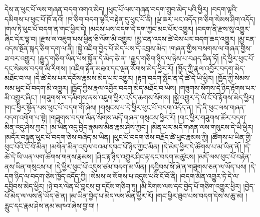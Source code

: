 དེས་ན་ཕུང་པོ་ལས་གཞན་བདག་འགའ་མེད། །ཕུང་པོ་ལས་གཞན་བདག་གྲུབ་མེད་པའི་ཕྱིར། །བདག་ལྟའི་དམིགས་པ་ཕུང་པོ་ཁོ་ནའོ། །ཁ་ཅིག་བདག་ལྟའི་བརྟེན་དུ་ཕུང་པོ་ནི། །ལྔ་ཆར་ཡང་འདོད་ཁ་ཅིག་སེམས་ཤིག་འདོད། །གལ་ཏེ་ཕུང་པོ་བདག་ན་གང་ཕྱིར་དེ། །མངས་པས་བདག་དེ་དག་ཀྱང་མང་པོར་འགྱུར། །བདག་ནི་རྫས་སུ་འགྱུར་ཞིང་དེར་ལྟ་བ། །རྫས་ལ་འཇུག་པས་ཕྱིན་ཅི་ལོག་མི་འགྱུར། །མྱ་ངན་འདས་ཚེ་ངེས་པར་བདག་ཆད་འགྱུར། །མྱ་ངན་འདས་སྔོན་སྐད་ཅིག་དག་ལ་ནི། །སྐྱེ་འཇིག་བྱེད་པོ་མེད་པས་དེ་འབྲས་མེད། །གཞན་གྱིས་བསགས་ལ་གཞན་གྱིས་ཟ་བར་འགྱུར། །རྒྱུད་གཅིག་ཡིན་པས་སྐྱོན་དེ་མེད་ཅེ་ན། །རྒྱུད་གཅིག་ཉིད་ལ་ཉེས་པ་བཤད་ཟིན་ཏོ། །དེ་ཕྱིར་ཕུང་པོ་དང་སེམས་བདག་མི་རིགས། །འཇིག་རྟེན་མཐའ་དང་ལྡན་སོགས་མེད་ཕྱིར་རོ། །ཁྱོད་ཀྱི་རྣལ་འབྱོར་བདག་མེད་མཐོང་བ་ལ། །དེ་ཚེ་ངེས་པར་དངོས་རྣམས་མེད་པར་འགྱུར། །རྟག་བདག་སྤོང་ན་དེ་ཚེ་དེ་ཡི་ཕྱིར། །ཁྱོད་ཀྱི་སེམས་སམ་ཕུང་པོ་བདག་མི་འགྱུར། །ཁྱོད་ཀྱིས་རྣལ་འབྱོར་བདག་མེད་མཐོང་བ་ཡིས། །གཟུགས་སོགས་དེ་ཉིད་རྟོགས་པར་མི་འགྱུར་ཞིང་། །གཟུགས་ལ་དམིགས་ནས་འཇུག་ཕྱིར་འདོད་ཆགས་སོགས། །སྐྱེ་འགྱུར་དེ་ཡི་ངོ་བོ་རྟོགས་མེད་ཕྱིར། །གང་ཕྱིར་སྟོན་པས་ཕུང་པོ་བདག་གོ་ཞེས། །གསུངས་པ་དེ་ཕྱིར་ཕུང་པོ་བདག་འདོད་ན། །དེ་ནི་ཕུང་ལས་གཞན་བདག་འགོག་པ་སྟེ། །གཟུགས་བདག་མིན་སོགས་མདོ་གཞན་གསུངས་ཕྱིར་རོ། །གང་ཕྱིར་གཟུགས་ཚོར་བདག་མིན་འདུ་ཤེས་ཀྱང་། །མ་ཡིན་འདུ་བྱེད་རྣམས་མིན་རྣམ་ཤེས་ཀྱང་། །མིན་པར་མདོ་གཞན་ལས་གསུངས་དེ་ཡི་ཕྱིར། །མདོར་བསྟན་ཕུང་པོ་བདག་ཅེས་བཞེད་མ་ཡིན། །ཕུང་པོ་བདག་ཅེས་བརྗོད་ཚེ་ཕུང་རྣམས་ཀྱི། །ཚོགས་པ་ཡིན་གྱི་ཕུང་པོའི་ངོ་བོ་མིན། །མགོན་མིན་འདུལ་བའམ་དབང་པོ་ཉིད་ཀྱང་མིན། །དེ་མེད་ཕྱིར་དེ་ཚོགས་པ་མ་ཡིན་ནོ། །དེ་ཚེ་དེ་ཡི་ཡན་ལག་ཚོགས་གནས་རྣམས། །ཤིང་རྟ་ཉིད་འགྱུར་ཤིང་རྟ་དང་བདག་མཚུངས། །མདོ་ལས་ཕུང་པོ་བརྟེན་ནས་ཡིན་གསུངས་པ། །དེ་ཕྱིར་ཕུང་པོ་འདུས་ཙམ་བདག་མ་ཡིན། །དབྱིབས་སོ་ཞེ་ན་གཟུགས་ཅན་ལ་ཡོད་པས། །དེ་དག་ཉིད་ལ་བདག་ཅེས་ཁྱོད་འདོད་ཀྱི། །སེམས་ལ་སོགས་པ་འདུས་པའི་ངོ་བོ་ནི། །བདག་མིན་འགྱུར་ཏེ་དེ་ལ་དབྱིབས་མེད་ཕྱིར། །ཉེ་བར་ལེན་པོ་བླངས་བྱ་དངོས་གཅིག་ཏུ། །མི་རིགས་ལས་དང་བྱེད་པོ་གཅིག་འགྱུར་ཕྱིར། །བྱེད་པོ་མེད་ལ་ལས་ནི་ཡོད་ཅེ་ན། །མ་ཡིན་བྱེད་པ་མེད་ལས་མིན་ཕྱིར་རོ། །གང་ཕྱིར་ཐུབ་པས་བདག་དེས་ས་ཆུ་མེ། །རླུང་དང་རྣམ་ཤེས་ནམ་མཁའ་ཞེས་བྱ་བ། །
